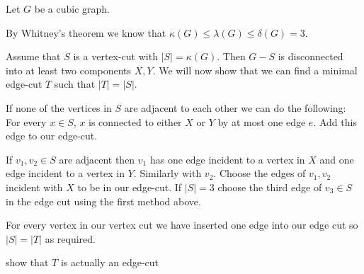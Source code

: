 Let $G$ be a cubic graph. 

By Whitney's theorem we know that $\kappa(G) \le \lambda(G) \le \delta(G) = 3 $.

Assume that $S$ is a vertex-cut with $|S| = \kappa(G)$. Then
$G-S$ is disconnected into at least two components $X, Y$. 
We will now show that we can find a minimal edge-cut $T$ such that $|T| = |S|$.

If none of the vertices in $S$ are adjacent to each other we can do the following:
For every $x \in S$, $x$ is connected to either $X$ or $Y$ by at most one edge $e$. 
Add this edge to our edge-cut.

If $v_1, v_2 \in S$ are adjacent then $v_1$ has one edge incident to a vertex 
in $X$ and one edge incident to a vertex in $Y$. Similarly with $v_2$. Choose 
the edges of $v_1, v_2$ incident with $X$ to be in our edge-cut. If $|S| = 3$ 
choose the third edge of $v_3 \in S$ in the edge cut using the first method 
above. 


For every vertex in our vertex cut we have inserted one edge into our edge
cut so $|S| = |T|$ as required. 

show that $T$ is actually an edge-cut
